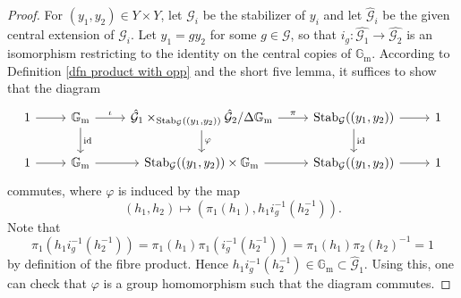 \documentclass[10pt]{article}
\newcommand{\stab}[2]{\mathrm{Stab}_{#1}(#2)}
\newcommand{\id}{\mathrm{id}}
\newcommand{\Gm}{{\mathbb{G}_\mathrm{m}}}
\theoremstyle{definition}
\theoremstyle{remark}
\newcommand{\Zz}{\mathcal{G}}
\begin{document}
\begin{proof}
For $(y_1,y_2)\in Y\times Y$, let $\Zz_i$ be the stabilizer of $y_i$ and let $\hat{\Zz}_i$ be the 
given 
central extension of $\Zz_i$. Let $y_1=gy_2$ for some $g\in \Zz$, so that 
$i_g\colon\hat{\Zz_1}\to\hat{\Zz_2}$ is an isomorphism restricting to the 
identity on the central copies of $\Gm$. According to Definition \ref{dfn product with opp} and the 
short five lemma, it suffices to show that the diagram 
%
\[
\begin{tikzcd}
1\arrow[r]&\Gm\arrow[d, "\id"]\arrow[r, "\iota"]&\hat{\Zz}_1\times_{\stab{\Zz}{(y_1,y_2)}}\hat{\Zz}_2/\Delta\Gm\arrow[r,"\pi"]\arrow[d, "\varphi"]&\stab{\Zz}{(y_1,y_2)}\arrow[d, "\id"]\arrow[r]&1\\
1\arrow[r]&\Gm\arrow[r]&\stab{\Zz}{(y_1,y_2)}\times\Gm\arrow[r]&\stab{\Zz}{(y_1,y_2)}\arrow[r]&1
\end{tikzcd}
\]
%
commutes, where $\varphi$ is induced by the map 
%
\[
(h_1,h_2)\mapsto (\pi_1(h_1),h_1i_g^{-1}(h_2^{-1})).
\]
%
Note that 
%
\[
\pi_1(h_1i_g^{-1}(h_2^{-1}))=\pi_1(h_1)\pi_1(i_g^{-1}(h_2^{-1}))=\pi_1(h_1)\pi_2(h_2)^{-1}=1
\]
%
by definition of the fibre product. Hence $h_1i_g^{-1}(h_2^{-1})\in\Gm\subset\hat{\Zz}_1$. 
Using this, one can check that $\varphi$ is a group homomorphism such that the diagram commutes.
\end{proof}
%
\end{document}
